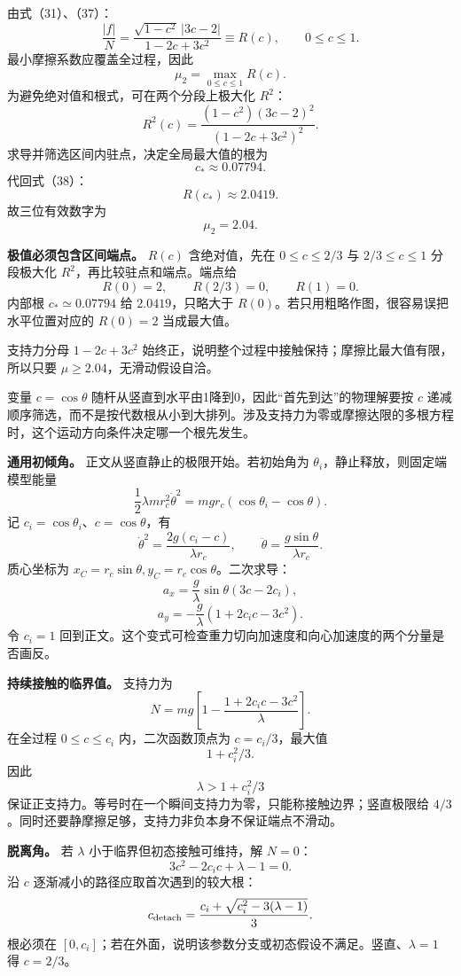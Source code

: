 \documentclass[12pt,a4paper,UTF8]{ctexart}
\begin{document}
由式（31）、（37）： \[
\frac{|f|}{N}
=\frac{\sqrt{1-c^2}\,|3c-2|}{1-2c+3c^2}
\equiv R(c),
\qquad 0\leq c\leq1. \tag{39}
\] 最小摩擦系数应覆盖全过程，因此 \[
\mu_2=\max_{0\leq c\leq1}R(c). \tag{40}
\] 为避免绝对值和根式，可在两个分段上极大化 \(R^2\)： \[
R^2(c)=\frac{(1-c^2)(3c-2)^2}{(1-2c+3c^2)^2}. \tag{41}
\] 求导并筛选区间内驻点，决定全局最大值的根为 \[
c_*\approx0.07794. \tag{42}
\] 代回式（38）： \[
R(c_*)\approx2.0419.
\] 故三位有效数字为 \[
\boxed{\mu_2=2.04}. \tag{43}
\]

\textbf{极值必须包含区间端点。} \(R(c)\) 含绝对值，先在 \(0\le c\le2/3\)
与 \(2/3\le c\le1\) 分段极大化 \(R^2\)，再比较驻点和端点。端点给 \[
R(0)=2,\qquad R(2/3)=0,\qquad R(1)=0.
\] 内部根 \(c_*\simeq0.07794\) 给 \(2.0419\)，只略大于
\(R(0)\)。若只用粗略作图，很容易误把水平位置对应的 \(R(0)=2\)
当成最大值。

支持力分母 \(1-2c+3c^2\)
始终正，说明整个过程中接触保持；摩擦比最大值有限，所以只要
\(\mu\ge2.04\)，无滑动假设自洽。

变量 \(c=\cos\theta\)
随杆从竖直到水平由1降到0，因此``首先到达''的物理解要按 \(c\)
递减顺序筛选，而不是按代数根从小到大排列。涉及支持力为零或摩擦达限的多根方程时，这个运动方向条件决定哪一个根先发生。

\textbf{通用初倾角。} 正文从竖直静止的极限开始。若初始角为
\(\theta_i\)，静止释放，则固定端模型能量 \[
\frac12\lambda mr_c^2\dot\theta^2
=mgr_c(\cos\theta_i-\cos\theta).
\] 记 \(c_i=\cos\theta_i\)、\(c=\cos\theta\)，有 \[
\dot\theta^2=\frac{2g(c_i-c)}{\lambda r_c},
\qquad
\ddot\theta=\frac{g\sin\theta}{\lambda r_c}.
\] 质心坐标为 \(x_C=r_c\sin\theta,y_C=r_c\cos\theta\)。二次求导： \[
a_x=\frac g\lambda\sin\theta(3c-2c_i),
\] \[
a_y=-\frac g\lambda(1+2c_ic-3c^2).
\] 令 \(c_i=1\)
回到正文。这个变式可检查重力切向加速度和向心加速度的两个分量是否画反。

\textbf{持续接触的临界值。} 支持力为 \[
N=mg\left[1-\frac{1+2c_ic-3c^2}{\lambda}\right].
\] 在全过程 \(0\le c\le c_i\) 内，二次函数顶点为 \(c=c_i/3\)，最大值 \[
1+c_i^2/3.
\] 因此 \[
\boxed{\lambda>1+c_i^2/3}
\] 保证正支持力。等号时在一个瞬间支持力为零，只能称接触边界；竖直极限给
\(4/3\)。同时还要静摩擦足够，支持力非负本身不保证端点不滑动。

\textbf{脱离角。} 若 \(\lambda\) 小于临界但初态接触可维持，解 \(N=0\)：
\[
3c^2-2c_ic+\lambda-1=0.
\] 沿 \(c\) 逐渐减小的路径应取首次遇到的较大根： \[
c_{\rm detach}=\frac{c_i+\sqrt{c_i^2-3(\lambda-1)}}3.
\] 根必须在
\([0,c_i]\)；若在外面，说明该参数分支或初态假设不满足。竖直、\(\lambda=1\)
得 \(c=2/3\)。
\end{document}
